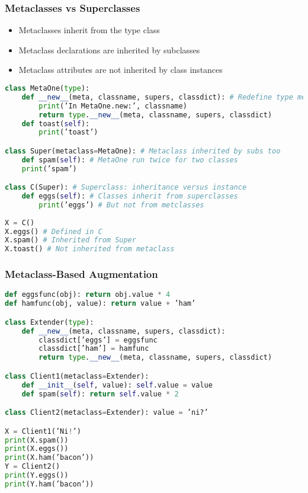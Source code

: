 \subsubsection{Metaclasses vs Superclasses}

\begin{itemize}
	\item Metaclasses inherit from the type class
	\item Metaclass declarations are inherited by subclasses
	\item Metaclass attributes are not inherited by class instances
\end{itemize}

\begin{lstlisting}[language=Python]
class MetaOne(type):
	def __new__(meta, classname, supers, classdict): # Redefine type method
		print(’In MetaOne.new:’, classname)
		return type.__new__(meta, classname, supers, classdict)
	def toast(self):
		print(’toast’)

class Super(metaclass=MetaOne): # Metaclass inherited by subs too
	def spam(self): # MetaOne run twice for two classes
	print(’spam’)

class C(Super): # Superclass: inheritance versus instance
	def eggs(self): # Classes inherit from superclasses
		print(’eggs’) # But not from metclasses
		
X = C()
X.eggs() # Defined in C
X.spam() # Inherited from Super
X.toast() # Not inherited from metaclass
\end{lstlisting}

\subsubsection{Metaclass-Based Augmentation}

\begin{lstlisting}[language=Python]
def eggsfunc(obj): return obj.value * 4
def hamfunc(obj, value): return value + ’ham’

class Extender(type):
	def __new__(meta, classname, supers, classdict):
		classdict[’eggs’] = eggsfunc
		classdict[’ham’] = hamfunc
		return type.__new__(meta, classname, supers, classdict)

class Client1(metaclass=Extender):
	def __init__(self, value): self.value = value
	def spam(self): return self.value * 2

class Client2(metaclass=Extender): value = ’ni?’

X = Client1(’Ni!’)
print(X.spam())
print(X.eggs())
print(X.ham(’bacon’))
Y = Client2()
print(Y.eggs())
print(Y.ham(’bacon’))
\end{lstlisting}

